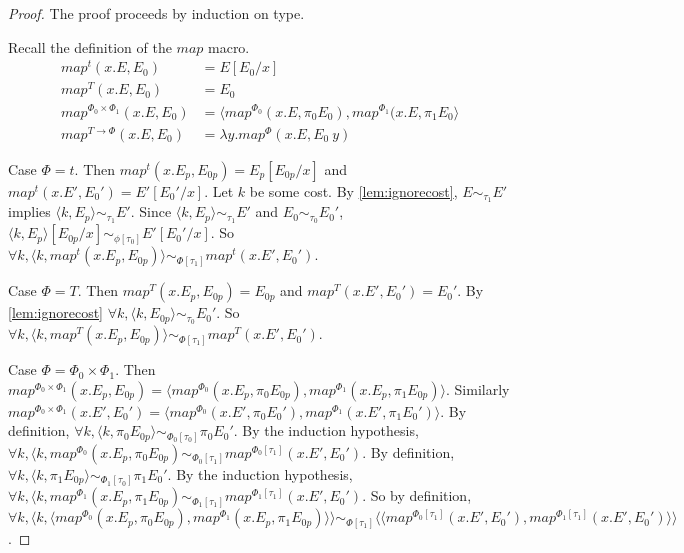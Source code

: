 %
\begin{proof}
  The proof proceeds by induction on type.

  Recall the definition of the $map$ macro.
  \begin{align*}
    map^t(x.E, E_0) &= E[E_0/x]                                                                                       \\
    map^T(x.E, E_0) &= E_0                                                                                            \\ 
    map^{\Phi_0 \times \Phi_1}(x.E, E_0) &= \langle map^{\Phi_0}(x.E, \pi_0 E_0), map^{\Phi_1}(x.E, \pi_1 E_0 \rangle \\
    map^{T \to \Phi}(x.E, E_0) &= \lambda y.map^\Phi(x.E, E_0\ y)
  \end{align*}

  Case $\Phi = t$.
  Then $map^t(x.E_p, E_{0p}) = E_p[E_{0p}/x]$ and $map^t(x.E', E_0') = E'[E_0'/x]$.
  Let $k$ be some cost.
  By \ref{lem:ignorecost}, $E \sim_{\tau_1} E'$ implies $\langle k, E_p \rangle \sim_{\tau_1} E'$.
  Since $\langle k, E_p \rangle \sim_{\tau_1} E'$ and $E_0 \sim_{\tau_0} E_0'$, $\langle k, E_p \rangle [E_{0p}/x] \sim_{\phi[\tau_0]} E'[E_0'/x]$.
  So $\forall k, \langle k, map^t(x.E_p, E_{0p}) \rangle \sim_{\Phi[\tau_1]} map^t(x.E', E_0')$.

  Case $\Phi = T$.
  Then $map^T(x.E_p, E_{0p}) = E_{0p}$ and $map^T(x.E', E_0') = E_0'$.
  By \ref{lem:ignorecost} $\forall k, \langle k, E_{0p} \rangle \sim_{\tau_0} E_0'$.
  So $\forall k, \langle k, map^T(x.E_p, E_{0p}) \rangle \sim_{\Phi[\tau_1]} map^T(x.E', E_0')$.

  Case $\Phi = \Phi_0 \times \Phi_1$.
  Then $map^{\Phi_0 \times \Phi_1}(x. E_p, E_{0p}) = \langle map^{\Phi_0}(x. E_p, \pi_0 E_{0p}), map^{\Phi_1}(x. E_p, \pi_1 E_{0p}) \rangle$.
  Similarly $map^{\Phi_0 \times \Phi_1}(x. E', E_0') = \langle map^{\Phi_0}(x. E', \pi_0 E_0'), map^{\Phi_1}(x. E', \pi_1 E_0') \rangle$.
  By definition, $\forall k, \langle k, \pi_0 E_{0p} \rangle \sim_{\Phi_0[\tau_0]} \pi_0 E_0'$.
  By the induction hypothesis, $\forall k, \langle k, map^{\Phi_0}(x. E_p, \pi_0 E_{0p}) \sim_{\Phi_0[\tau_1]} map^{\Phi_0[\tau_1]}(x. E', E_0')$.
  By definition, $\forall k, \langle k, \pi_1 E_{0p} \rangle \sim_{\Phi_1[\tau_0]} \pi_1 E_0'$.
  By the induction hypothesis, $\forall k, \langle k, map^{\Phi_1}(x. E_p, \pi_1 E_{0p}) \sim_{\Phi_1[\tau_1]} map^{\Phi_1[\tau_1]}(x. E', E_0')$.
  So by definition, $\forall k, \langle k, \langle map^{\Phi_0}(x. E_p, \pi_0 E_{0p}), map^{\Phi_1}(x. E_p, \pi_1 E_{0p}) \rangle \rangle \sim_{\Phi[\tau_1]} \langle \langle map^{\Phi_0[\tau_1]}(x. E', E_0'), map^{\Phi_1[\tau_1]}(x. E', E_0') \rangle \rangle$.


\end{proof}
